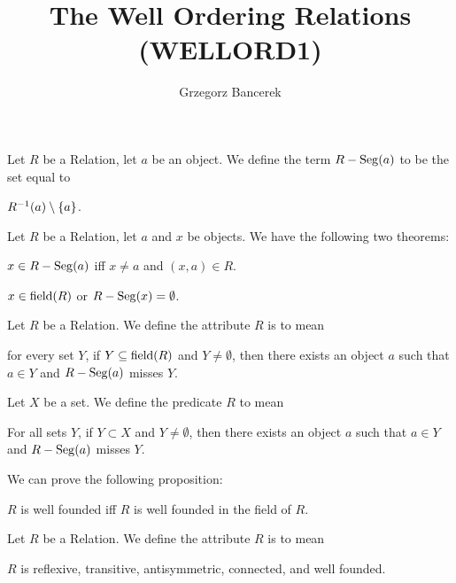 \documentclass{article}
\title{The Well Ordering Relations (WELLORD1)}
\author{Grzegorz Bancerek}
\begin{document}
\maketitle

\begin{definition}
Let $R$ be a Relation, let $a$ be an object.
We define the term $R-\operatorname{Seg}(a)$ to be the set equal to
\begin{defn}
\item $R^{-1}(a)\setminus\{a\}$.
\end{defn}
\end{definition}

Let $R$ be a Relation, let $a$ and $x$ be objects. We have the following
two theorems:
\begin{thm}
\item\label{wellord1:1} $x\in R-\operatorname{Seg}(a)$ iff $x\neq a$ and $(x,a)\in R$.
\item\label{wellord1:2} $x\in\operatorname{field}(R)$ or $R-\operatorname{Seg}(x)=\emptyset$.
\end{thm}

\begin{definition}
Let $R$ be a Relation. We define the attribute $R$ is 
to mean
\begin{defn}
\item for every set $Y$, if $Y\subseteq\operatorname{field}(R)$ and $Y\neq\emptyset$,
  then there exists an object $a$ such that $a\in Y$ and $R-\operatorname{Seg}(a)$
  misses $Y$.
\end{defn}
Let $X$ be a set. We define the predicate $R$ 
to mean
\begin{defn}
\item For all sets $Y$, if $Y\subset X$ and $Y\neq\emptyset$,
  then there exists an object $a$ such that $a\in Y$ and $R-\operatorname{Seg}(a)$
  misses $Y$.
\end{defn}
\end{definition}

We can prove the following proposition:
\begin{thm}
\item\label{wellord1:3} $R$ is well founded iff $R$ is well founded in
  the field of $R$.
\end{thm}

\begin{definition}
Let $R$ be a Relation. We define the attribute $R$ is 
to mean
\begin{defn}
\item $R$ is reflexive, transitive, antisymmetric, connected, and well founded.
\end{defn}
\end{definition}
\end{document}
